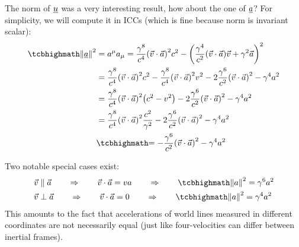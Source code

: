 \documentclass[../relativity_main.tex]{subfiles}
\begin{document}
The norm of $\underline{u}$ was a very interesting result, how about the one of $\underline{a}$? For simplicity, we will compute it in ICCs (which is fine because norm is invariant scalar):
\begin{align}\label{eq:norm_four_acc}
	\eqbox{\norm{\fvec{a}}^2} &= a^\mu a_\mu = \frac{\gamma^8}{c^4} \qty(\vec{v} \cdot \vec{a})^2 c^2 - \qty(\frac{\gamma^4}{c^2} \qty(\vec{v} \cdot \vec{a}) \vec{v} + \gamma^2 \vec{a})^2
	\notag\\
	&= \frac{\gamma^8}{c^4} \qty(\vec{v} \cdot \vec{a})^2 c^2 - \frac{\gamma^8}{c^4} \qty(\vec{v} \cdot \vec{a})^2 v^2 - 2 \frac{\gamma^6}{c^2} \qty(\vec{v} \cdot \vec{a})^2 - \gamma^4 a^2
	\notag\\
	&= \frac{\gamma^8}{c^4} \qty(\vec{v} \cdot \vec{a})^2 \qty(c^2 - v^2) - 2 \frac{\gamma^6}{c^2} \qty(\vec{v} \cdot \vec{a})^2 - \gamma^4 a^2
	\notag\\
	&= \frac{\gamma^8}{c^4} \qty(\vec{v} \cdot \vec{a})^2 \frac{c^2}{\gamma^2} - 2 \frac{\gamma^6}{c^2} \qty(\vec{v} \cdot \vec{a})^2 - \gamma^4 a^2
	\notag\\
	&\eqbox{= - \frac{\gamma^6}{c^2} \qty(\vec{v} \cdot \vec{a})^2 - \gamma^4 a^2} %
\end{align}

Two notable special cases exist:
\begin{align}
	\vec{v} &\parallel \vec{a} \qquad \Rightarrow \qquad \vec{v} \cdot \vec{a} = v a \qquad \Rightarrow \qquad \eqbox{\norm{a}^2 = \gamma^6 a^2}
	\label{eq:norm_four_acc_parallel}\\
	\vec{v} &\perp \vec{a} \qquad \Rightarrow \qquad \vec{v} \cdot \vec{a} = 0 \qquad \Rightarrow \qquad \eqbox{\norm{a}^2 = \gamma^4 a^2}
	\label{eq:norm_four_acc_perpendicular}
\end{align}
This amounts to the fact that accelerations of world lines measured in different coordinates are not necessarily equal (just like four-velocities can differ between inertial frames).\\
\end{document}
